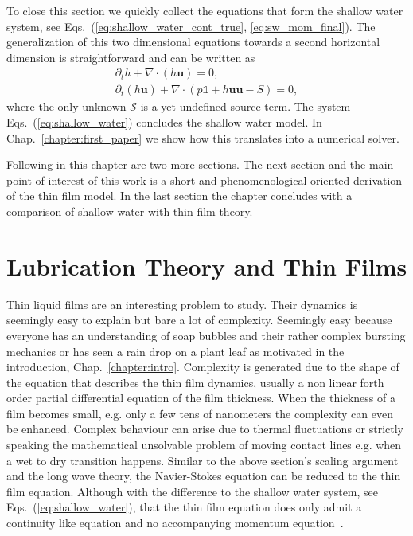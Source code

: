 To close this section we quickly collect the equations that form the shallow water system, see Eqs.~(\ref{eq:shallow_water_cont_true}, \ref{eq:sw_mom_final}).
The generalization of this two dimensional equations towards a second horizontal dimension is straightforward and can be written as~\cite{Salmon:1999:0022-2402:503, PhysRevE.65.036309, thommes2007lattice}
\begin{gather}\label{eq:shallow_water}
        \partial_t h + \nabla \cdot (h\mathbf{u}) = 0, \\
        \partial_t (h\mathbf{u}) + \nabla\cdot (p \mathbb{1} + h\mathbf{u}\mathbf{u} - S) = 0, 
\end{gather}
where the only unknown $\mathcal{S}$ is a yet undefined source term. 
The system Eqs.~(\ref{eq:shallow_water}) concludes the shallow water model. 
In Chap.~\ref{chapter:first_paper} we show how this translates into a numerical solver.

Following in this chapter are two more sections.
The next section and the main point of interest of this work is a short and phenomenological oriented derivation of the thin film model.
In the last section the chapter concludes with a comparison of shallow water with thin film theory.

\section{Lubrication Theory and Thin Films}
\label{sec:thin_films}
Thin liquid films are an interesting problem to study.
Their dynamics is seemingly easy to explain but bare a lot of complexity.
Seemingly easy because everyone has an understanding of soap bubbles and their rather complex bursting mechanics or has seen a rain drop on a plant leaf as motivated in the introduction, Chap.~\ref{chapter:intro}.
Complexity is generated due to the shape of the equation that describes the thin film dynamics, usually a non linear forth order partial differential equation of the film thickness.
When the thickness of a film becomes small, e.g. only a few tens of nanometers the complexity can even be enhanced. 
Complex behaviour can arise due to thermal fluctuations or strictly speaking the mathematical unsolvable problem of moving contact lines e.g. when a wet to dry transition happens.
Similar to the above section's scaling argument and the long wave theory, the Navier-Stokes equation can be reduced to the thin film equation. 
Although with the difference to the shallow water system, see Eqs.~(\ref{eq:shallow_water}), that the thin film equation does only admit a continuity like equation and no accompanying momentum equation~\cite{oronLongscaleEvolutionThin1997, RevModPhys.57.827, RevModPhys.81.1131}.

